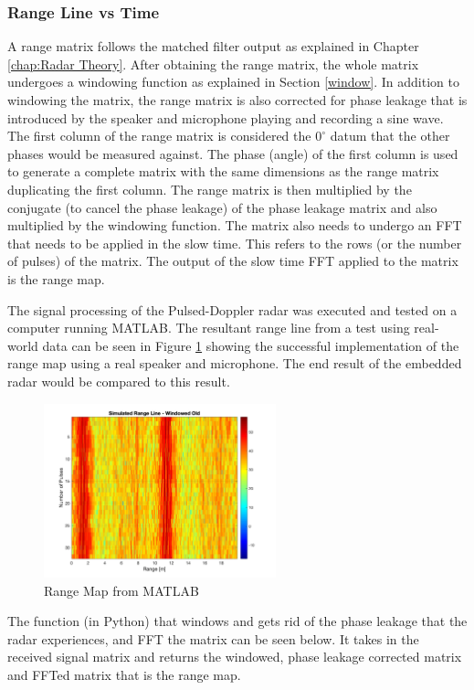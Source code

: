 \subsubsection{Range Line vs Time}
A range matrix follows the matched filter output as explained in Chapter \ref{chap:Radar Theory}. After obtaining the range matrix, the whole matrix undergoes a windowing function as explained in Section \ref{window}. In addition to windowing the matrix, the range matrix is also corrected for phase leakage that is introduced by the speaker and microphone playing and recording a sine wave. The first column of the range matrix is considered the $0^\circ$ datum that the other phases would be measured against. The phase (angle) of the first column is used to generate a complete matrix with the same dimensions as the range matrix duplicating the first column. The range matrix is then multiplied by the conjugate (to cancel the phase leakage) of the phase leakage matrix and also multiplied by the windowing function. The matrix also needs to undergo an FFT that needs to be applied in the slow time. This refers to the rows (or the number of pulses) of the matrix. The output of the slow time FFT applied to the matrix is the range map. 

The signal processing of the Pulsed-Doppler radar was executed and tested on a computer running MATLAB. The resultant range line from a test using real-world data can be seen in Figure \ref{fig:pdMATLAB} showing the successful implementation of the range map using a real speaker and microphone. The end result of the embedded radar would be compared to this result.

\begin{figure}[h!]
    \centering
    \includegraphics[width = 0.6\textwidth]{images/pd.pdf}
    \caption{Range Map from MATLAB}\label{fig:pdMATLAB}
\end{figure}

The function (in Python) that windows and gets rid of the phase leakage that the radar experiences, and FFT the matrix can be seen below. It takes in the received signal matrix and returns the windowed, phase leakage corrected matrix and FFTed matrix that is the range map.  %

